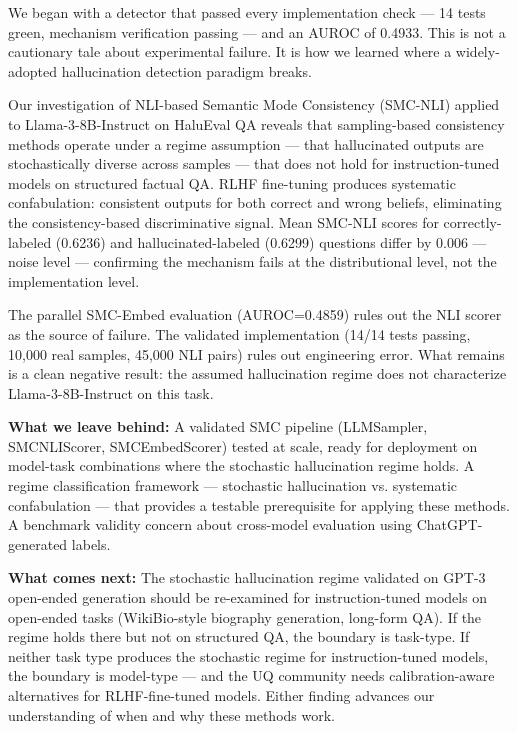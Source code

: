 
We began with a detector that passed every implementation check --- 14 tests green, mechanism verification passing --- and an AUROC of 0.4933. This is not a cautionary tale about experimental failure. It is how we learned where a widely-adopted hallucination detection paradigm breaks.

Our investigation of NLI-based Semantic Mode Consistency (SMC-NLI) applied to Llama-3-8B-Instruct on HaluEval QA reveals that sampling-based consistency methods operate under a regime assumption --- that hallucinated outputs are stochastically diverse across samples --- that does not hold for instruction-tuned models on structured factual QA. RLHF fine-tuning produces systematic confabulation: consistent outputs for both correct and wrong beliefs, eliminating the consistency-based discriminative signal. Mean SMC-NLI scores for correctly-labeled (0.6236) and hallucinated-labeled (0.6299) questions differ by 0.006 --- noise level --- confirming the mechanism fails at the distributional level, not the implementation level.

The parallel SMC-Embed evaluation (AUROC=0.4859) rules out the NLI scorer as the source of failure. The validated implementation (14/14 tests passing, 10,000 real samples, 45,000 NLI pairs) rules out engineering error. What remains is a clean negative result: the assumed hallucination regime does not characterize Llama-3-8B-Instruct on this task.

\textbf{What we leave behind:} A validated SMC pipeline (LLMSampler, SMCNLIScorer, SMCEmbedScorer) tested at scale, ready for deployment on model-task combinations where the stochastic hallucination regime holds. A regime classification framework --- stochastic hallucination vs. systematic confabulation --- that provides a testable prerequisite for applying these methods. A benchmark validity concern about cross-model evaluation using ChatGPT-generated labels.

\textbf{What comes next:} The stochastic hallucination regime validated on GPT-3 open-ended generation should be re-examined for instruction-tuned models on open-ended tasks (WikiBio-style biography generation, long-form QA). If the regime holds there but not on structured QA, the boundary is task-type. If neither task type produces the stochastic regime for instruction-tuned models, the boundary is model-type --- and the UQ community needs calibration-aware alternatives for RLHF-fine-tuned models. Either finding advances our understanding of when and why these methods work.

